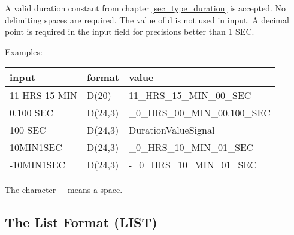 \begin{enumerate}
A valid duration constant from chapter \ref{sec_type_duration} is accepted.
No delimiting spaces are required.
The value of d is not used in input. A decimal point is required in the
input field for precisions better than 1 SEC.

Examples:

\begin{tabular}{lll}
input               & format  & value \\ \hline
11 HRS 15 MIN & D(20)   & 11\_HRS\_15\_MIN\_00\_SEC \\
0.100 SEC    & D(24,3) & \_0\_HRS\_00\_MIN\_00.100\_SEC \\
100 SEC    & D(24,3) & DurationValueSignal \\
10MIN1SEC    & D(24,3) & \_0\_HRS\_10\_MIN\_01\_SEC \\
-10MIN1SEC    & D(24,3) & -\_0\_HRS\_10\_MIN\_01\_SEC \\
\end{tabular}

The character \_ means a space.

\end{enumerate}



\subsection{The List Format (LIST)}    %
\label{sec_dation_list_format}



